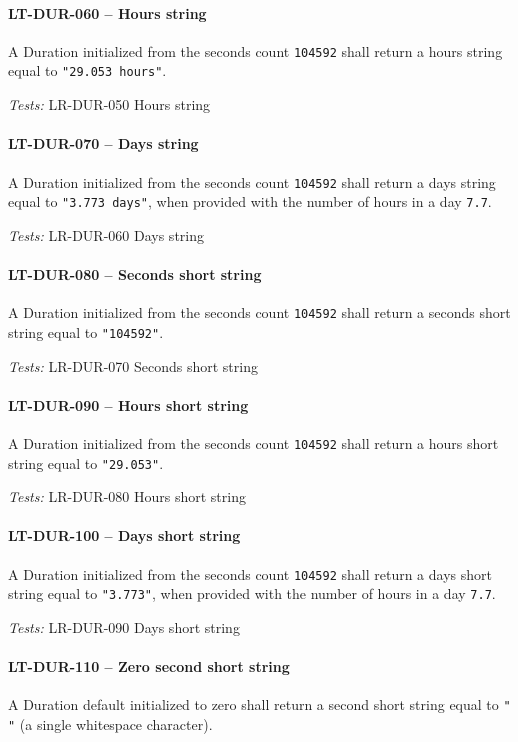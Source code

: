 \paragraph{LT-DUR-060 -- Hours string}
A Duration initialized from the seconds count \lstinline{104592}
shall return a hours string equal to \lstinline{"29.053 hours"}.

\textit{Tests: } LR-DUR-050 Hours string

\paragraph{LT-DUR-070 -- Days string}
A Duration initialized from the seconds count \lstinline{104592}
shall return a days string equal to \lstinline{"3.773 days"},
when provided with the number of hours in a day \lstinline{7.7}.

\textit{Tests: } LR-DUR-060 Days string

\paragraph{LT-DUR-080 -- Seconds short string}
A Duration initialized from the seconds count \lstinline{104592}
shall return a seconds short string equal to \lstinline{"104592"}.

\textit{Tests: } LR-DUR-070 Seconds short string

\paragraph{LT-DUR-090 -- Hours short string}
A Duration initialized from the seconds count \lstinline{104592}
shall return a hours short string equal to \lstinline{"29.053"}.

\textit{Tests: } LR-DUR-080 Hours short string

\paragraph{LT-DUR-100 -- Days short string}
A Duration initialized from the seconds count \lstinline{104592}
shall return a days short string equal to \lstinline{"3.773"},
when provided with the number of hours in a day \lstinline{7.7}.

\textit{Tests: } LR-DUR-090 Days short string

\paragraph{LT-DUR-110 -- Zero second short string}
A Duration default initialized to zero shall return a second short
string equal to \lstinline{" "} (a single whitespace character).

